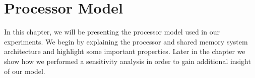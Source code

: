 
\chapter{Processor Model}
\label{cpt:processor_model}

In this chapter, we will be presenting the processor model used in our experiments.
We begin by explaining the processor and shared memory system architecture and highlight some important properties.
Later in the chapter we show how we performed a sensitivity analysis in order to gain additional insight of our model.


